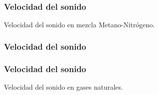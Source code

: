 \documentclass[aspectratio=1610,multi,rgb]{beamer}
\begin{document}
\subsubsection{Velocidad del sonido}
\begin{frame}
	Velocidad del sonido en mezcla Metano-Nitrógeno.
	\frametitle{Velocidad del sonido}
\end{frame}

\begin{frame}[t]
	\frametitle{Velocidad del sonido}
	Velocidad del sonido en gases naturales.
\end{frame}
\end{document}
